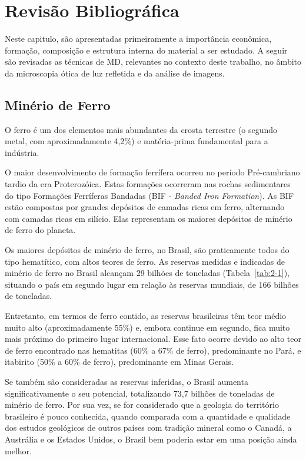 
\chapter{Revisão Bibliográfica}

Neste capitulo, são apresentadas primeiramente a importância
econômica, formação, composição e estrutura interna do material a ser
estudado.  A seguir são revisadas as técnicas de MD, relevantes no
contexto deste trabalho, no âmbito da microscopia ótica de luz
refletida e da análise de imagens.

\section{Minério de Ferro}

O ferro é um dos elementos mais abundantes da crosta terrestre (o
segundo metal, com aproximadamente 4,2\%) e matéria-prima fundamental
para a indústria.

O maior desenvolvimento de formação ferrífera ocorreu no período
Pré-cambriano tardio da era Proterozóica. Estas formações ocorreram
nas rochas sedimentares do tipo Formações Ferríferas Bandadas (BIF -
\textit{Banded Iron Formation}).\cite{15,16} As BIF estão compostas
por grandes depósitos de camadas ricas em ferro, alternando com
camadas ricas em silício. Elas representam os maiores depósitos de
minério de ferro do planeta.\cite{17}

Os maiores depósitos de minério de ferro, no Brasil, são praticamente
todos do tipo hematítico, com altos teores de ferro.\cite{18} As
reservas medidas e indicadas de minério de ferro no Brasil alcançam 29
bilhões de toneladas (Tabela~\ref{tab:2-1}), situando o país em
segundo lugar em relação às reservas mundiais, de 166 bilhões de
toneladas.\cite{19}



Entretanto, em termos de ferro contido, as reservas brasileiras têm
teor médio muito alto (aproximadamente 55\%) e, embora continue em
segundo, fica muito mais próximo do primeiro lugar internacional. Esse
fato ocorre devido ao alto teor de ferro encontrado nas hematitas
(60\% a 67\% de ferro), predominante no Pará, e itabirito (50\% a 60\%
de ferro), predominante em Minas Gerais.\cite{20}



Se também são consideradas as reservas inferidas, o Brasil aumenta
significativamente o seu potencial, totalizando 73,7 bilhões de
toneladas de minério de ferro.\cite{21} Por sua vez, se for
considerado que a geologia do território brasileiro é pouco conhecida,
quando comparada com a quantidade e qualidade dos estudos geológicos
de outros países com tradição mineral como o Canadá, a Austrália e os
Estados Unidos, o Brasil bem poderia estar em uma posição ainda
melhor.

